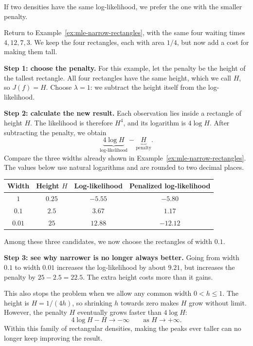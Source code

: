 \documentclass[a4paper,12pt,oneside]{report}
\begin{document}
If two densities have the same log-likelihood, we prefer the
one with the smaller penalty.

\begin{framedexample}{}
\label{ex:penalized-narrow-rectangles}
Return to Example~\ref{ex:mle-narrow-rectangles}, with the same
four waiting times $4,12,7,3$. We keep the four rectangles,
each with area $1/4$, but now add a cost for making them tall.

\textbf{Step 1: choose the penalty.}
For this example, let the penalty be the height of the tallest
rectangle. All four rectangles have the same height, which we
call $H$, so $J(f)=H$. Choose $\lambda=1$: we subtract the
height itself from the log-likelihood.

\textbf{Step 2: calculate the new result.}
Each observation lies inside a rectangle of height $H$.
The likelihood is therefore $H^4$, and its logarithm is
$4\log H$. After subtracting the penalty, we obtain
\[
  \underbrace{4\log H}_{\text{log-likelihood}}
    -\underbrace{H}_{\text{penalty}}.
\]
Compare the three widths already shown in
Example~\ref{ex:mle-narrow-rectangles}. The values below use
natural logarithms and are rounded to two decimal places.
\begin{center}
\begin{tabular}{@{}cccc@{}}
  \toprule
  Width & Height $H$ & Log-likelihood & Penalized log-likelihood\\
  \midrule
  $1$ & $0.25$ & $-5.55$ & $-5.80$\\
  $0.1$ & $2.5$ & $3.67$ & $\mathbf{1.17}$\\
  $0.01$ & $25$ & $12.88$ & $-12.12$\\
  \bottomrule
\end{tabular}
\end{center}
Among these three candidates,
we now choose the rectangles of width $0.1$.

\textbf{Step 3: see why narrower is no longer always better.}
Going from width $0.1$ to width $0.01$ increases the
log-likelihood by about $9.21$, but increases the penalty
by $25-2.5=22.5$. The extra height costs more than it gains.

This also stops the problem when we allow any common width
$0<h\leq1$. The height is $H=1/(4h)$, so shrinking $h$
towards zero makes $H$ grow without limit. However, the
penalty $H$ eventually grows faster than $4\log H$:
\[
  4\log H-H\longrightarrow-\infty
  \qquad\text{as }H\longrightarrow+\infty.
\]
Within this family of rectangular densities, making the peaks
ever taller can no longer keep improving the result.
\end{framedexample}
\end{document}
